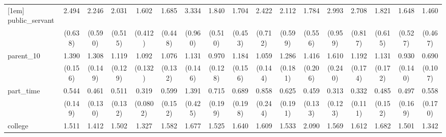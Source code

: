{\begin{tabular}{l*{16}{c}}
[1em]
public\_servant      &       2.494\sym{***}&       2.246\sym{**} &       2.031\sym{**} &       1.602         &       1.685\sym{*}  &       3.334\sym{***}&       1.840\sym{*}  &       1.704\sym{*}  &       2.422\sym{**} &       2.112\sym{**} &       1.784         &       2.993\sym{***}&       2.708\sym{***}&       1.821         &       1.648         &       1.460         \\
                    &     (0.638)         &     (0.590)         &     (0.515)         &     (0.412)         &     (0.448)         &     (0.960)         &     (0.510)         &     (0.453)         &     (0.712)         &     (0.599)         &     (0.556)         &     (0.959)         &     (0.817)         &     (0.615)         &     (0.527)         &     (0.467)         \\
[1em]
parent\_10           &       1.390\sym{**} &       1.308\sym{*}  &       1.119         &       1.092         &       1.076         &       1.131         &       0.970         &       1.184         &       1.059         &       1.286         &       1.416\sym{*}  &       1.610\sym{**} &       1.192         &       1.131         &       0.930         &       0.690\sym{*}  \\
                    &     (0.156)         &     (0.149)         &     (0.129)         &     (0.132)         &     (0.132)         &     (0.146)         &     (0.128)         &     (0.156)         &     (0.144)         &     (0.181)         &     (0.206)         &     (0.240)         &     (0.174)         &     (0.172)         &     (0.140)         &     (0.107)         \\
[1em]
part\_time           &       0.544\sym{*}  &       0.461\sym{**} &       0.511\sym{**} &       0.319\sym{***}&       0.599\sym{*}  &       1.391         &       0.715         &       0.689         &       0.858         &       0.625         &       0.459\sym{**} &       0.313\sym{**} &       0.332\sym{***}&       0.485\sym{*}  &       0.497\sym{*}  &       0.558         \\
                    &     (0.149)         &     (0.130)         &     (0.132)         &    (0.0802)         &     (0.152)         &     (0.425)         &     (0.199)         &     (0.198)         &     (0.244)         &     (0.191)         &     (0.133)         &     (0.123)         &     (0.111)         &     (0.152)         &     (0.169)         &     (0.170)         \\
[1em]
college             &       1.511\sym{**} &       1.412\sym{**} &       1.502\sym{**} &       1.327\sym{*}  &       1.582\sym{**} &       1.677\sym{***}&       1.525\sym{**} &       1.640\sym{**} &       1.609\sym{**} &       1.533\sym{**} &       2.090\sym{***}&       1.569\sym{*}  &       1.612\sym{**} &       1.682\sym{**} &       1.501\sym{*}  &       1.342         \\

\end{tabular}}
